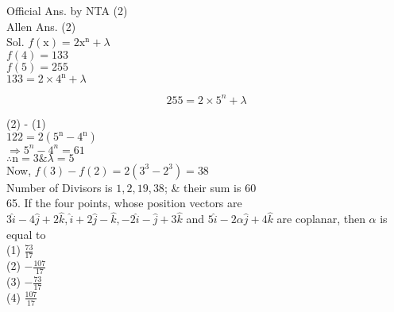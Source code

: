 \documentclass[10pt]{article}
\begin{document}
Official Ans. by NTA (2)\\
Allen Ans. (2)\\
Sol. \(f(\mathrm{x})=2 \mathrm{x}^{\mathrm{n}}+\lambda\)\\
\(f(4)=133\)\\
\(f(5)=255\)\\
\(133=2 \times 4^{\mathrm{n}}+\lambda\)

\[
255=2 \times 5^{n}+\lambda
\]

(2) - (1)\\
\(122=2\left(5^{\mathrm{n}}-4^{\mathrm{n}}\right)\)\\
\(\Rightarrow 5^{n}-4^{n}=61\)\\
\(\therefore \mathrm{n}=3 \& \lambda=5\)\\
Now, \(f(3)-f(2)=2\left(3^{3}-2^{3}\right)=38\)\\
Number of Divisors is \(1,2,19,38\); \& their sum is 60\\
65. If the four points, whose position vectors are \(3 \hat{i}-4 \hat{j}+2 \hat{k}, \hat{i}+2 \hat{j}-\hat{k},-2 \hat{i}-\hat{j}+3 \hat{k}\) and \(5 \hat{i}-2 \alpha \hat{j}+4 \hat{k}\) are coplanar, then \(\alpha\) is equal to\\
(1) \(\frac{73}{17}\)\\
(2) \(-\frac{107}{17}\)\\
(3) \(-\frac{73}{17}\)\\
(4) \(\frac{107}{17}\)
\end{document}
